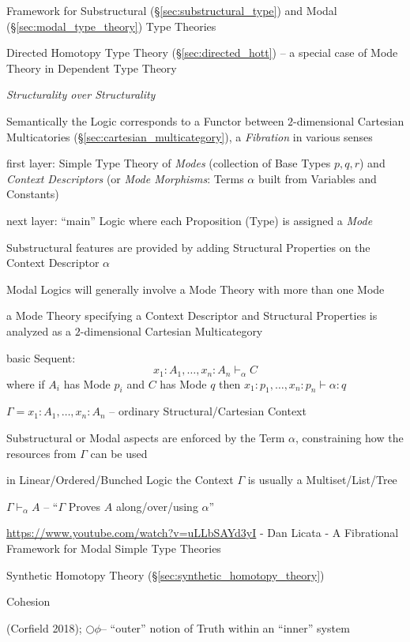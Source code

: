 {Framework for Substructural (\S\ref{sec:substructural_type}) and Modal
(\S\ref{sec:modal_type_theory}) Type Theories

\fist Directed Homotopy Type Theory (\S\ref{sec:directed_hott}) --
a special case of Mode Theory in Dependent Type Theory

\emph{Structurality over Structurality}

Semantically the Logic corresponds to a Functor between
$2$-dimensional Cartesian Multicatories
(\S\ref{sec:cartesian_multicategory}), a \emph{Fibration} in various
senses

first layer: Simple Type Theory of \emph{Modes} (collection of Base
Types $p,q,r$) and \emph{Context Descriptors} (or \emph{Mode
  Morphisms}: Terms $\alpha$ built from Variables and Constants)

next layer: ``main'' Logic where each Proposition (Type) is assigned a
\emph{Mode}

Substructural features are provided by adding Structural Properties on
the Context Descriptor $\alpha$

Modal Logics will generally involve a Mode Theory with more than one
Mode

a Mode Theory specifying a Context Descriptor and Structural
Properties is analyzed as a $2$-dimensional Cartesian Multicategory

basic Sequent:
\[
  x_1:A_1,\ldots,x_n:A_n \vdash_\alpha C
\]
where if $A_i$ has Mode $p_i$ and $C$ has Mode $q$ then
$x_1:p_1,\ldots,x_n:p_n \vdash \alpha:q$

$\Gamma = x_1:A_1,\ldots,x_n:A_n$ -- ordinary Structural/Cartesian
Context

Substructural or Modal aspects are enforced by the Term $\alpha$,
constraining how the resources from $\Gamma$ can be used

in Linear/Ordered/Bunched Logic the Context $\Gamma$ is usually a
Multiset/List/Tree

$\Gamma \vdash_\alpha A$ -- ``$\Gamma$ Proves $A$ along/over/using
$\alpha$''

\asterism

\url{https://www.youtube.com/watch?v=uLLbSAYd3yI} - Dan Licata - A Fibrational
Framework for Modal Simple Type Theories

Synthetic Homotopy Theory (\S\ref{sec:synthetic_homotopy_theory})

Cohesion

\asterism

(Corfield 2018); $\bigcirc\phi$-- ``outer'' notion of Truth within an ``inner''
system

}

